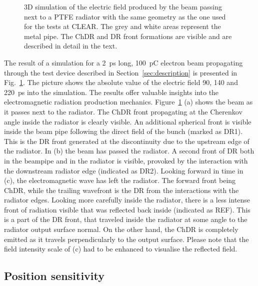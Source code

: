 \begin{figure}[!b]
\caption{3D simulation of the electric field produced by the beam passing next to a PTFE radiator with the same geometry as the one used for the tests at CLEAR. The grey and white areas represent the metal pipe. The ChDR and DR front formations are visible and are described in detail in the text.}
\label{fig:field_CLEAR_simulation}
\end{figure}

The result of a simulation for a 2~ps long, 100~pC electron beam propagating through the test device described in Section~\ref{sec:description} is presented in Fig.~\ref{fig:field_CLEAR_simulation}. The picture shows the absolute value of the electric field 90, 140 and 220~ps into the simulation. The results offer valuable insights into the electromagnetic radiation production mechanics. Figure~\ref{fig:field_CLEAR_simulation} (a) shows the beam as it passes next to the radiator. The ChDR front propagating at the Cherenkov angle inside the radiator is clearly visible. An additional spherical front is visible inside the beam pipe following the direct field of the bunch (marked as DR1). This is the DR front generated at the discontinuity due to the upstream edge of the radiator. In (b) the beam has passed the radiator. A second front of DR both in the beampipe and in the radiator is visible, provoked by the interaction with the downstream radiator edge (indicated as DR2). Looking forward in time in (c), the electromagnetic wave has left the radiator. The forward front being ChDR, while the trailing wavefront is the DR from the interactions with the radiator edges. Looking more carefully inside the radiator, there is a less intense front of radiation visible that was reflected back inside (indicated as REF). This is a part of the DR front, that traveled inside the radiator at some angle to the radiator output surface normal. On the other hand, the ChDR is completely emitted as it travels perpendicularly to the output surface. Please note that the field intensity scale of (c) had to be enhanced to visualise the reflected field.











\subsection[Position sensitivity]{Position sensitivity}\label{sec:position_sensitivity}

